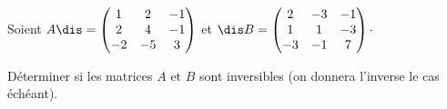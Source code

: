 \documentclass[a4paper,10pt]{report}
\begin{document}
\begin{ex}
%
%

\vspace{13cm}
\end{ex}

\begin{exa} Soient $A\dis  = \begin{pmatrix} 1 & 2 & -1\\
2 & 4 & -1\\
-2 & -5 & 3
\end{pmatrix}$ et $ \dis B = \begin{pmatrix}
                   2 & -3 & -1\\
1 & 1 & -3\\
-3 & -1 & 7
                  \end{pmatrix}\cdot$
                  
\noindent Déterminer si les matrices $A$ et $B$ sont inversibles (on donnera l'inverse le cas échéant).
\end{exa}
\end{document}
